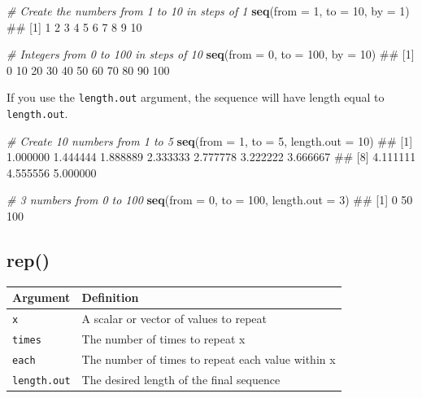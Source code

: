 \documentclass[]{book}
\newenvironment{Shaded}{\begin{snugshade}}{\end{snugshade}}
\newcommand{\KeywordTok}[1]{\textcolor[rgb]{0.13,0.29,0.53}{\textbf{#1}}}
\newcommand{\DataTypeTok}[1]{\textcolor[rgb]{0.13,0.29,0.53}{#1}}
\newcommand{\DecValTok}[1]{\textcolor[rgb]{0.00,0.00,0.81}{#1}}
\newcommand{\CommentTok}[1]{\textcolor[rgb]{0.56,0.35,0.01}{\textit{#1}}}
\newcommand{\NormalTok}[1]{#1}
\theoremstyle{definition}
\theoremstyle{definition}
\theoremstyle{remark}
\begin{document}
\begin{Shaded}
\begin{Highlighting}[]
\CommentTok{# Create the numbers from 1 to 10 in steps of 1}
\KeywordTok{seq}\NormalTok{(}\DataTypeTok{from =} \DecValTok{1}\NormalTok{, }\DataTypeTok{to =} \DecValTok{10}\NormalTok{, }\DataTypeTok{by =} \DecValTok{1}\NormalTok{)}
\NormalTok{##  [1]  1  2  3  4  5  6  7  8  9 10}

\CommentTok{# Integers from 0 to 100 in steps of 10}
\KeywordTok{seq}\NormalTok{(}\DataTypeTok{from =} \DecValTok{0}\NormalTok{, }\DataTypeTok{to =} \DecValTok{100}\NormalTok{, }\DataTypeTok{by =} \DecValTok{10}\NormalTok{)}
\NormalTok{##  [1]   0  10  20  30  40  50  60  70  80  90 100}
\end{Highlighting}
\end{Shaded}

If you use the \texttt{length.out} argument, the sequence will have
length equal to \texttt{length.out}.

\begin{Shaded}
\begin{Highlighting}[]
\CommentTok{# Create 10 numbers from 1 to 5}
\KeywordTok{seq}\NormalTok{(}\DataTypeTok{from =} \DecValTok{1}\NormalTok{, }\DataTypeTok{to =} \DecValTok{5}\NormalTok{, }\DataTypeTok{length.out =} \DecValTok{10}\NormalTok{)}
\NormalTok{##  [1] 1.000000 1.444444 1.888889 2.333333 2.777778 3.222222 3.666667}
\NormalTok{##  [8] 4.111111 4.555556 5.000000}

\CommentTok{# 3 numbers from 0 to 100}
\KeywordTok{seq}\NormalTok{(}\DataTypeTok{from =} \DecValTok{0}\NormalTok{, }\DataTypeTok{to =} \DecValTok{100}\NormalTok{, }\DataTypeTok{length.out =} \DecValTok{3}\NormalTok{)}
\NormalTok{## [1]   0  50 100}
\end{Highlighting}
\end{Shaded}

\subsection{rep()}\label{rep}

\begin{longtable}[]{@{}ll@{}}
\toprule
Argument & Definition\tabularnewline
\midrule
\endhead
\texttt{x} & A scalar or vector of values to repeat\tabularnewline
\texttt{times} & The number of times to repeat x\tabularnewline
\texttt{each} & The number of times to repeat each value within
x\tabularnewline
\texttt{length.out} & The desired length of the final
sequence\tabularnewline
\bottomrule
\end{longtable}
\end{document}
